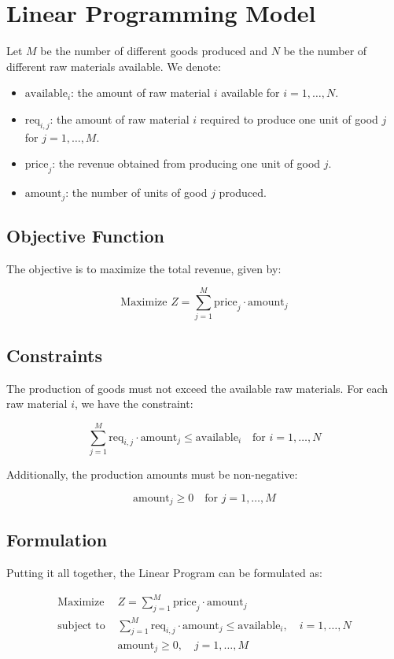 \documentclass{article}
\begin{document}
\section*{Linear Programming Model}

Let \( M \) be the number of different goods produced and \( N \) be the number of different raw materials available. We denote:

\begin{itemize}
    \item \( \text{available}_{i} \): the amount of raw material \( i \) available for \( i = 1, \ldots, N \).
    \item \( \text{req}_{i,j} \): the amount of raw material \( i \) required to produce one unit of good \( j \) for \( j = 1, \ldots, M \).
    \item \( \text{price}_{j} \): the revenue obtained from producing one unit of good \( j \).
    \item \( \text{amount}_{j} \): the number of units of good \( j \) produced.
\end{itemize}

\subsection*{Objective Function}
The objective is to maximize the total revenue, given by:

\[
\text{Maximize } Z = \sum_{j=1}^{M} \text{price}_{j} \cdot \text{amount}_{j}
\]

\subsection*{Constraints}
The production of goods must not exceed the available raw materials. For each raw material \( i \), we have the constraint:

\[
\sum_{j=1}^{M} \text{req}_{i,j} \cdot \text{amount}_{j} \leq \text{available}_{i} \quad \text{for } i = 1, \ldots, N
\]

Additionally, the production amounts must be non-negative:

\[
\text{amount}_{j} \geq 0 \quad \text{for } j = 1, \ldots, M
\]

\subsection*{Formulation}
Putting it all together, the Linear Program can be formulated as:

\[
\begin{align*}
\text{Maximize } & Z = \sum_{j=1}^{M} \text{price}_{j} \cdot \text{amount}_{j} \\
\text{subject to } & \sum_{j=1}^{M} \text{req}_{i,j} \cdot \text{amount}_{j} \leq \text{available}_{i}, \quad i = 1, \ldots, N \\
& \text{amount}_{j} \geq 0, \quad j = 1, \ldots, M
\end{align*}
\]
\end{document}
